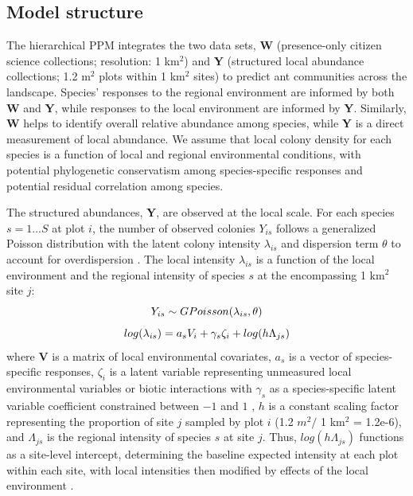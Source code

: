 \documentclass[preprint,review,times,12pt,3p]{elsarticle}
\begin{document}
\subsection{Model structure}
The hierarchical PPM integrates the two data sets, \textbf{W} (presence-only citizen science collections; resolution: 1 km$^2$) and \textbf{Y} (structured local abundance collections; 1.2 m$^2$ plots within 1 km$^2$ sites) to predict ant communities across the landscape. Species' responses to the regional environment are informed by both \textbf{W} and \textbf{Y}, while responses to the local environment are informed by \textbf{Y}. Similarly, \textbf{W} helps to identify overall relative abundance among species, while \textbf{Y} is a direct measurement of local abundance. We assume that local colony density for each species is a function of local and regional environmental conditions, with potential phylogenetic conservatism among species-specific responses and potential residual correlation among species.

The structured abundances, \textbf{Y}, are observed at the local scale. For each species $s=1 \dots S$  at plot $i$, the number of observed colonies $Y_{is}$ follows a generalized Poisson distribution with the latent colony intensity $\lambda_{is}$ and dispersion term $\theta$ to account for overdispersion \citep{Consul1992,Ntzoufras2005,Isaac2019,Miller2019}. The local intensity $\lambda_{is}$ is a function of the local environment and the regional intensity of species $s$ at the encompassing 1 km$^2$ site $j$:
    \begin{equation}
        Y_{is} \sim GPoisson(\lambda_{is}, \theta) \\
        \label{eq:Y_GP}
    \end{equation}
    \begin{equation}
        log(\lambda_{is}) = a_s V_i + \gamma_s \zeta_i + log(h\Lambda_{js}) \\
        \label{eq:lambda}
    \end{equation}
where \textbf{V} is a matrix of local environmental covariates, $a_s$ is a vector of species-specific responses, $\zeta_i$ is a latent variable representing unmeasured local environmental variables or biotic interactions with $\gamma_s$ as a species-specific latent variable coefficient constrained between $-1$ and $1$ \citep{Ovaskainen2016,Caradima2019,Tobler2019}, $h$ is a constant scaling factor representing the proportion of site $j$ sampled by plot $i$ (1.2 $m^2 /$ 1 km$^2$ = 1.2e-6), and $\Lambda_{js}$ is the regional intensity of species $s$ at site $j$. Thus, $log(h\Lambda_{js})$ functions as a site-level intercept, determining the baseline expected intensity at each plot within each site, with local intensities then modified by effects of the local environment \citep{Yamaura2016,Miller2019}.
\end{document}
